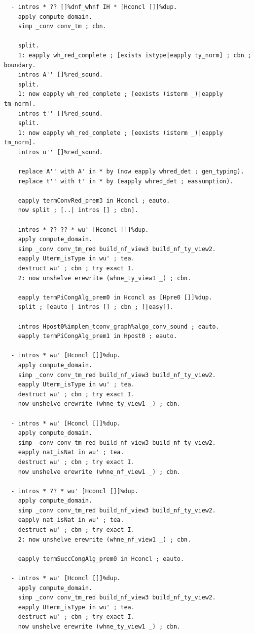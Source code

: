 \documentclass[10pt,a4paper]{amsart}
\begin{document}
\begin{lstlisting}
  - intros * ?? []%dnf_whnf IH * [Hconcl []]%dup.
    apply compute_domain.
    simp _conv conv_tm ; cbn.

    split.
    1: eapply wh_red_complete ; [exists istype|eapply ty_norm] ; cbn ; boundary.
    intros A'' []%red_sound.
    split.
    1: now eapply wh_red_complete ; [eexists (isterm _)|eapply tm_norm].
    intros t'' []%red_sound.
    split.
    1: now eapply wh_red_complete ; [eexists (isterm _)|eapply tm_norm].
    intros u'' []%red_sound.

    replace A'' with A' in * by (now eapply whred_det ; gen_typing).
    replace t'' with t' in * by (eapply whred_det ; eassumption).

    eapply termConvRed_prem3 in Hconcl ; eauto.
    now split ; [..| intros [] ; cbn].

  - intros * ?? ?? * wu' [Hconcl []]%dup.
    apply compute_domain.
    simp _conv conv_tm_red build_nf_view3 build_nf_ty_view2.
    eapply Uterm_isType in wu' ; tea.
    destruct wu' ; cbn ; try exact I.
    2: now unshelve erewrite (whne_ty_view1 _) ; cbn.

    eapply termPiCongAlg_prem0 in Hconcl as [Hpre0 []]%dup.
    split ; [eauto | intros [] ; cbn ; [|easy]].

    intros Hpost0%implem_tconv_graph%algo_conv_sound ; eauto.
    eapply termPiCongAlg_prem1 in Hpost0 ; eauto.

  - intros * wu' [Hconcl []]%dup.
    apply compute_domain.
    simp _conv conv_tm_red build_nf_view3 build_nf_ty_view2.
    eapply Uterm_isType in wu' ; tea.
    destruct wu' ; cbn ; try exact I.
    now unshelve erewrite (whne_ty_view1 _) ; cbn.

  - intros * wu' [Hconcl []]%dup.
    apply compute_domain.
    simp _conv conv_tm_red build_nf_view3 build_nf_ty_view2.
    eapply nat_isNat in wu' ; tea.
    destruct wu' ; cbn ; try exact I.
    now unshelve erewrite (whne_nf_view1 _) ; cbn.

  - intros * ?? * wu' [Hconcl []]%dup.
    apply compute_domain.
    simp _conv conv_tm_red build_nf_view3 build_nf_ty_view2.
    eapply nat_isNat in wu' ; tea.
    destruct wu' ; cbn ; try exact I.
    2: now unshelve erewrite (whne_nf_view1 _) ; cbn.

    eapply termSuccCongAlg_prem0 in Hconcl ; eauto.

  - intros * wu' [Hconcl []]%dup.
    apply compute_domain.
    simp _conv conv_tm_red build_nf_view3 build_nf_ty_view2.
    eapply Uterm_isType in wu' ; tea.
    destruct wu' ; cbn ; try exact I.
    now unshelve erewrite (whne_ty_view1 _) ; cbn.


\end{lstlisting}
\end{document}
